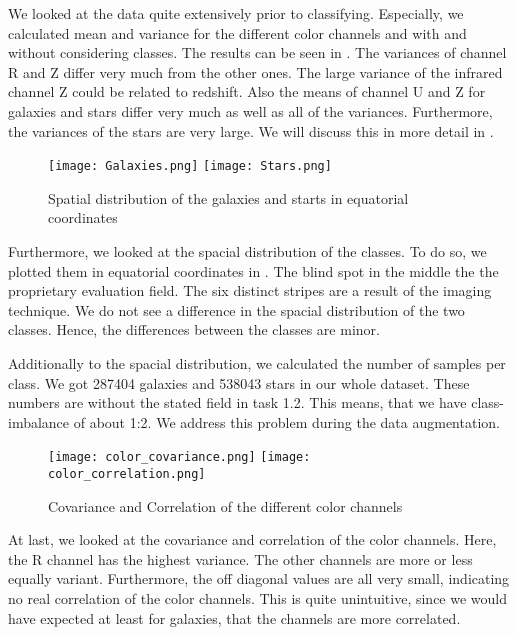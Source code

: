 We looked at the data quite extensively prior to classifying. Especially, we calculated mean and variance for the different color channels and with and without considering classes. The results can be seen in .
The variances of channel R and Z differ very much from the other ones. The large variance of the infrared channel Z could be related to redshift. Also the means of channel U and Z for galaxies and stars differ very much as well as all of the variances. Furthermore, the variances of the stars are very large. We will discuss this in more detail in .


\begin{figure}
    \texttt{[image: Galaxies.png]}
    \texttt{[image: Stars.png]}
    \caption{Spatial distribution of the galaxies and starts in equatorial coordinates}
    \label{distributionPlots}
\end{figure}

Furthermore, we looked at the spacial distribution of the classes. To do so, we plotted them in equatorial coordinates in . The blind spot in the middle the the proprietary evaluation field. The six distinct stripes are a result of the imaging technique. We do not see a difference in the spacial distribution of the two classes. Hence, the differences between the classes are minor.

Additionally to the spacial distribution, we calculated the number of samples per class. We got 287404 galaxies and  538043 stars in our whole dataset. These numbers are without the stated field in task 1.2. This means, that we have class-imbalance of about 1:2. We address this problem during the data augmentation.

\begin{figure}
    \texttt{[image: color\_covariance.png]}
    \texttt{[image: color\_correlation.png]}
    \caption[short]{Covariance and Correlation of the different color channels}
    \label{colorCorr}
\end{figure}

At last, we looked at the covariance and correlation of the color channels. Here, the R channel has the highest variance. The other channels are more or less equally variant. Furthermore, the off diagonal values are all very small, indicating no real correlation of the color channels. This is quite unintuitive, since we would have expected at least for galaxies, that the channels are more correlated.
